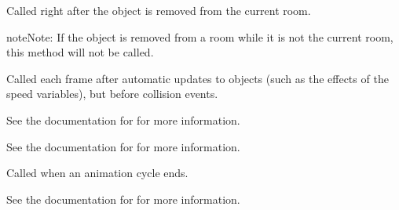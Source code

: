 \documentclass[letterpaper,10pt,english]{sphinxmanual}
\begin{document}

\begin{fulllineitems}
\label{dsp:sge.dsp.Object.event_destroy}
Called right after the object is removed from the current room.

\begin{notice}{note}{Note:}
If the object is removed from a room while it is not the
current room, this method will not be called.
\end{notice}

\end{fulllineitems}


\begin{fulllineitems}
\label{dsp:sge.dsp.Object.event_step}
Called each frame after automatic updates to objects (such as
the effects of the speed variables), but before collision
events.

See the documentation for {\hyperref[dsp:sge.dsp.Game.event_step]{\emph{}}} for
more information.

\end{fulllineitems}


\begin{fulllineitems}
\label{dsp:sge.dsp.Object.event_alarm}
See the documentation for {\hyperref[dsp:sge.dsp.Object.alarms]{\emph{}}} for more
information.

\end{fulllineitems}


\begin{fulllineitems}
\label{dsp:sge.dsp.Object.event_animation_end}
Called when an animation cycle ends.

\end{fulllineitems}


\begin{fulllineitems}
\label{dsp:sge.dsp.Object.event_key_press}
See the documentation for {\hyperref[input:sge.input.KeyPress]{\emph{}}} for more
information.

\end{fulllineitems}
\end{document}
